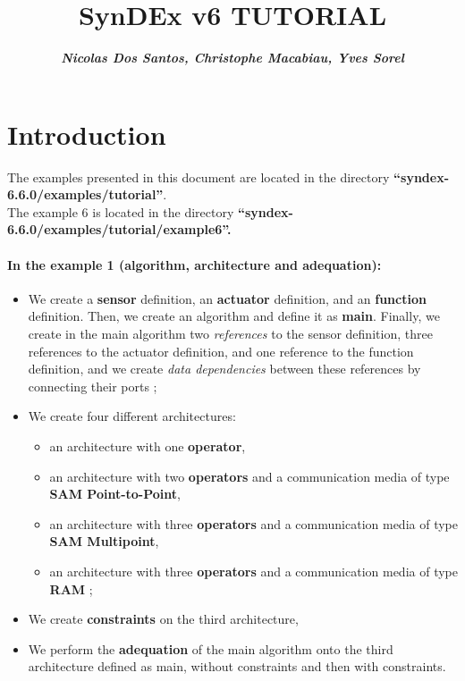 \documentclass[a4paper,twoside]{report}
\begin{document}
\title{\vskip 5cm
  {\huge SynDEx v6 TUTORIAL}\\
}
\author{
       \large \sl \bf  Nicolas Dos Santos, Christophe Macabiau, Yves Sorel \\
}

\maketitle


\cleardoublepage
\tableofcontents

\cleardoublepage
\chapter*{Introduction}

The examples presented in this document are located in the directory
\textbf{``syndex-6.6.0/examples/tutorial''}.\\ The example 6 is located in the
directory \textbf{``syndex-6.6.0/examples/tutorial/example6''.}

\medskip

\subsubsection{In the example 1 (algorithm, architecture and adequation):}
\begin{itemize}
\item We create a \textbf{sensor} definition, an \textbf{actuator} definition,
and an \textbf{function} definition. Then, we create an algorithm and define
it as \textbf{main}. Finally, we create in the main algorithm two
\textit{references} to the sensor definition, three references to the actuator
definition, and one reference to the function definition, and we create \textit{data
dependencies} between these references by connecting their ports ;

\item We create four different architectures: 
\begin{itemize}
\item an architecture with one \textbf{operator},
\item an architecture with two \textbf{operators} and a communication media of
type \textbf{SAM Point-to-Point},
\item an architecture with three \textbf{operators} and a communication media
of type \textbf{SAM Multipoint},
\item an architecture with three \textbf{operators} and a communication media
of type \textbf{RAM} ;
\end{itemize}

\item We create \textbf{constraints} on the third architecture,

\item We perform the \textbf{adequation} of the main algorithm onto the third
architecture defined as main, without constraints and then with constraints.
\end{itemize}
\end{document}
